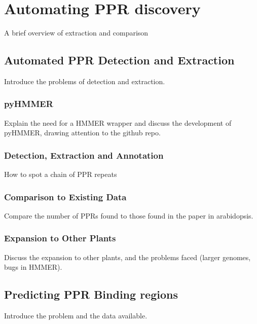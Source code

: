 
\chapter{Automating PPR discovery} 
\label{chap:methods}

A brief overview of extraction and comparison

\section{Automated PPR Detection and Extraction}
\label{sec:ppr_extraction}

Introduce the problems of detection and extraction.

\subsection{pyHMMER}
\label{ssec:pyHMMER}

Explain the need for a HMMER wrapper and discuss the development of pyHMMER,
drawing attention to the github repo.

\subsection{Detection, Extraction and Annotation}
\label{ssec:Detection}

How to spot a chain of PPR repeats


\subsection{Comparison to Existing Data}
\label{sseq:comparison}

Compare the number of PPRs found to those found in the paper in arabidopsis.

\subsection{Expansion to Other Plants}
\label{ssec:pprs_other}

Discuss the expansion to other plants, and the problems faced (larger genomes,
bugs in HMMER).

\section{Predicting PPR Binding regions}
\label{sec:ppr_binding_prediction}

Introduce the problem and the data available.

